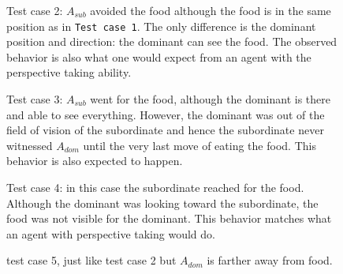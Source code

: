 \documentclass{article}
\begin{document}
\begin{figure}[H]
\begin{center}
    \caption{Test  case 2: \(A_{sub}\) avoided the food although the food is in the same position as in \texttt{Test case 1}. The only difference is the dominant position and direction: the dominant can see the food. The observed behavior is also what one would expect from an agent with the perspective taking ability.}
    \label{fig.tc.2}
\end{center}
\end{figure}
\begin{figure}[H]
\begin{center}
\caption{Test  case 3: \(A_{sub}\) went for the food, although the dominant is there and able to see everything. However, the dominant was out of the field of vision of the subordinate and hence the subordinate never witnessed \(A_{dom}\) until the very last move of eating the food. This behavior is also expected to happen.}
\label{fig.tc.3}
\end{center}
\end{figure}
\begin{figure}[H]
\begin{center}
\caption{Test  case 4: in this case the subordinate reached for the food. Although the dominant was looking toward the subordinate, the food was not visible for the dominant. This behavior matches what an agent with perspective taking would do.}
\label{fig.tc.4}
\end{center}
\end{figure}
\begin{figure}[H]
\begin{center}
\caption{test case 5, just like test case 2 but \(A_{dom}\) is farther away from food.}
\label{fig.tc.5}
\end{center}
\end{figure}
\end{document}
